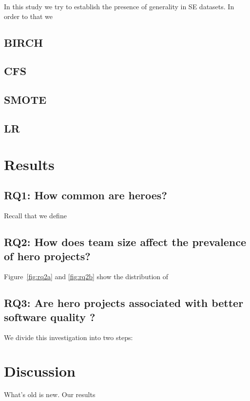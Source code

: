 \documentclass[sigconf]{acmart}
\theoremstyle{break}
\begin{document}
In this study we try to establish the presence of generality in SE datasets. In order to that we 

\subsection{BIRCH}
\label{subsec:BIRCH}

\subsection{CFS}
\label{subsec:CFS}

\subsection{SMOTE}
\label{subsec:SMOTE}

\subsection{LR}
\label{subsec:LR}
   

\section{Results}
\label{sec:results}

\subsection{RQ1: How common are heroes?}
\label{sec:rq1}

Recall that we define 



\subsection{RQ2: How does team size affect the prevalence of hero projects?}

Figure~\ref{fig:rq2a} and \ref{fig:rq2b} show the distribution of 






\subsection{RQ3: Are hero projects associated with  better software quality ?}
\label{sec:rq3}
We divide this investigation into two steps: 

\section{Discussion}
\label{sec:discuss}
What's old is new. Our results 
\end{document}
